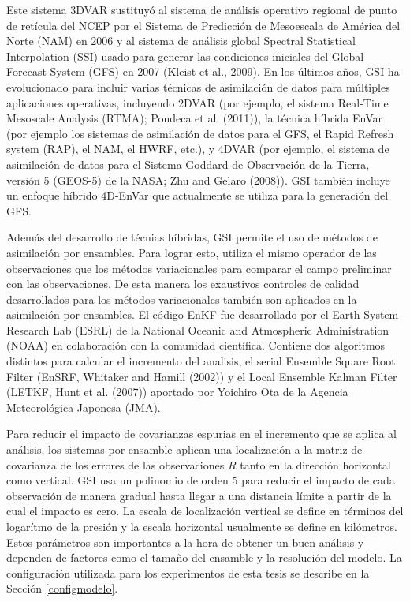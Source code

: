 \documentclass[12pt,oneside,a4paper]{reedthesis}
\begin{document}
Este sistema 3DVAR sustituyó al sistema de análisis operativo regional de punto de retícula del NCEP por el Sistema de Predicción de Mesoescala de América del Norte (NAM) en 2006 y al sistema de análisis global Spectral Statistical Interpolation (SSI) usado para generar las condiciones iniciales del Global Forecast System (GFS) en 2007 (Kleist et al., 2009).
En los últimos años, GSI ha evolucionado para incluir varias técnicas de asimilación de datos para múltiples aplicaciones operativas, incluyendo 2DVAR (por ejemplo, el sistema Real-Time Mesoscale Analysis (RTMA); Pondeca et al. (2011)), la técnica híbrida EnVar (por ejemplo los sistemas de asimilación de datos para el GFS, el Rapid Refresh system (RAP), el NAM, el HWRF, etc.), y 4DVAR (por ejemplo, el sistema de asimilación de datos para el Sistema Goddard de Observación de la Tierra, versión 5 (GEOS-5) de la NASA; Zhu and Gelaro (2008)).
GSI también incluye un enfoque híbrido 4D-EnVar que actualmente se utiliza para la generación del GFS.

Además del desarrollo de técnias híbridas, GSI permite el uso de métodos de asimilación por ensambles. Para lograr esto, utiliza el mismo operador de las observaciones que los métodos variacionales para comparar el campo preliminar con las observaciones.
De esta manera los exaustivos controles de calidad desarrollados para los métodos variacionales también son aplicados en la asimilación por ensambles.
El código EnKF fue desarrollado por el Earth System Research Lab (ESRL) de la National Oceanic and Atmospheric Administration (NOAA) en colaboración con la comunidad científica.
Contiene dos algoritmos distintos para calcular el incremento del analisis, el serial Ensemble Square Root Filter (EnSRF, Whitaker and Hamill (2002)) y el Local Ensemble Kalman Filter (LETKF, Hunt et al. (2007)) aportado por Yoichiro Ota de la Agencia Meteorológica Japonesa (JMA).

Para reducir el impacto de covarianzas espurias en el incremento que se aplica al análisis, los sistemas por ensamble aplican una localización a la matriz de covarianza de los errores de las observaciones \(R\) tanto en la dirección horizontal como vertical.
GSI usa un polinomio de orden 5 para reducir el impacto de cada observación de manera gradual hasta llegar a una distancia límite a partir de la cual el impacto es cero. La escala de localización vertical se define en términos del logarítmo de la presión y la escala horizontal usualmente se define en kilómetros.
Estos parámetros son importantes a la hora de obtener un buen análisis y dependen de factores como el tamaño del ensamble y la resolución del modelo. La configuración utilizada para los experimentos de esta tesis se describe en la Sección \ref{configmodelo}.
\end{document}
